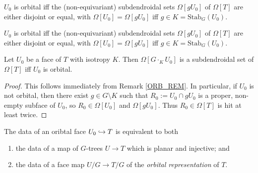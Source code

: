 \documentclass[a4paper,10pt,draft]{article}%
\begin{document}
\begin{remark}
      \label{ORB_REM}
      $U_0$ is orbital iff the (non-equivariant) subdendroidal sets $\Omega[g U_0]$ of $\Omega[T]$ are either
      disjoint or equal, with $\Omega[U_0] = \Omega[g U_0]$ iff $g \in K = \mathrm{Stab}_G(U_0)$.
\end{remark}

\begin{remark} \label{ORB_REM} 
$U_0$ is orbital iff the (non-equivariant) subdendroidal sets $\Omega[g U_0]$ of $\Omega[T]$ are either 
disjoint or equal, with $\Omega[U_0] = \Omega[g U_0]$ iff $g \in K = \mathrm{Stab}_G(U_0)$. 
\end{remark} 


\begin{lemma}
      \label{ORB_INJ_LEM}
      Let $U_0$ be a face of $T$ with isotropy $K$.
      Then $\Omega[G \cdot_K U_0]$ is a subdendroidal set of $\Omega[T]$
      iff
      $U_0$ is orbital.
\end{lemma}

\begin{proof}
      This follows immediately from Remark \ref{ORB_REM}.
      In particular, 
      if $U_0$ is not orbital, then there exist $g \in G \setminus K$ such that
      $R_0 := U_0 \cap g U_0$ is a proper, non-empty subface of $U_0$, so $R_0 \in \Omega[U_0]$ and $\Omega[g U_0]$.
      Thus $R_0 \in \Omega[T]$ is hit at least twice.
\end{proof}

\begin{remark}
      The data of an oribtal face $U_0 \hookrightarrow T$ is equivalent to both
      \begin{enumerate}
      \item the data of a map of $G$-trees $U \to T$ which is planar and injective; and
      \item the data of a face map $U/G \to T/G$ of the \textit{orbital representation} of $T$.
      \end{enumerate}
\end{remark}
\end{document}
